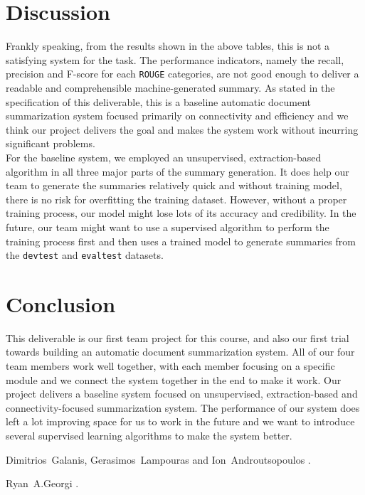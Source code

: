 \documentclass[11pt]{article}
\begin{document}
\section{Discussion}
Frankly speaking, from the results shown in the above tables, this is not a satisfying system for the task. The performance indicators, namely the recall, precision and F-score for each  \texttt{ROUGE} categories, are not good enough to deliver a readable and comprehensible machine-generated summary. As stated in the specification of this deliverable, this is a baseline automatic document summarization system focused primarily on connectivity and efficiency and we think our project delivers the goal and makes the system work without incurring significant problems.\\
\indent
For the baseline system, we employed an unsupervised, extraction-based algorithm in all three major parts of the summary generation. It does help our team to generate the summaries relatively quick and without training model, there is no risk for overfitting the training dataset. However, without a proper training process, our model might lose lots of its accuracy and credibility. In the future, our team might want to use a supervised algorithm to perform the training process first and then uses a trained model to generate summaries from the \texttt{devtest} and \texttt{evaltest} datasets. 

\section{Conclusion}

This deliverable is our first team project for this course, and also our first trial towards building an automatic document summarization system. All of our four team members work well together, with each member focusing on a specific module and we connect the system together in the end to make it work. Our project delivers a baseline system focused on unsupervised, extraction-based and connectivity-focused summarization system. The performance of our system does left a lot improving space for us to work in the future and we want to introduce several supervised learning algorithms to make the system better.

\begin{thebibliography}{}
Dimitrios~Galanis, Gerasimos~Lampouras and Ion~Androutsopoulos
.

Ryan~A.Georgi
.

\end{thebibliography}
\end{document}

